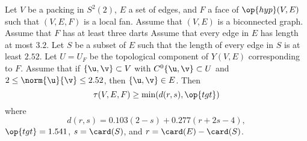 \begin{theorem}\label{lemma:main-estimate-12}
  Let $V$ be a packing in $S^2(2)$, $E$ a set of edges, and $F$ a face
  of $\op{hyp}(V,E)$ such that $(V,E,F)$ is a local fan.  Assume that
  $(V,E)$ is a biconnected graph.  Assume that $F$ has at least three
  darts Assume that every edge in $E$ has length at most $3.2$.  Let
  $S$ be a subset of $E$ such that the length of every edge in $S$ is
  at least $2.52$.  Let $U=U_F$ be the topological component of
  $Y(V,E)$ corresponding to $F$.  Assume that if $\{\u,\v\}\subset V$
  with $C^0\{\u,\v\}\subset U$ and $2\le\norm{\u}{\v} \le 2.52$, then
  $\{\u,\v\}\in E$.  Then
\begin{displaymath}\tau(V,E,F) \ge \min(d(r,s),\op{tgt})\end{displaymath}
where
\begin{displaymath}
d(r,s) = 0.103 (2-s) + 0.277 (r+2s-4),
\end{displaymath}
$\op{tgt}=1.541$, 
$s = \card(S)$, and $r = \card(E)-\card(S)$.
\end{theorem}

